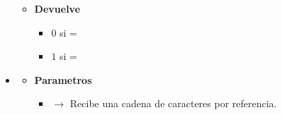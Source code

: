 \begin{itemize}
\begin{itemize}
\begin{itemize}
		\end{itemize}
		\item \textbf{Devuelve}
		\begin{itemize}
			\item $0$ si  = 
			\item $1$ si  = 
		\end{itemize}
	\end{itemize}
	\item\label{def:estviaje}
	\begin{itemize}
		\item \textbf{Parametros}
		\begin{itemize}
			\item {} $\rightarrow$ Recibe una cadena de caracteres por referencia.
			

\end{itemize}
\end{itemize}
\end{itemize}
